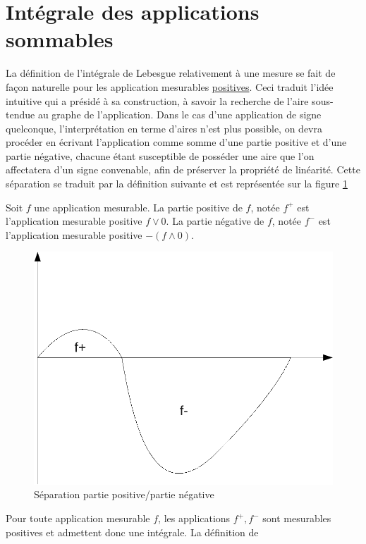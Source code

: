 \section{Intégrale des applications sommables}
La définition de l'intégrale de Lebesgue relativement à une mesure se fait de
façon naturelle pour les application mesurables \underline{positives}. Ceci
traduit l'idée intuitive qui a présidé à sa construction, à savoir la recherche
de l'aire sous-tendue au graphe de l'application. Dans le cas d'une application
de signe quelconque, l'interprétation en terme d'aires n'est plus possible, on
devra procéder en écrivant l'application comme somme d'une partie positive et
d'une partie négative, chacune étant susceptible de posséder une aire que 
l'on affectatera d'un signe convenable, afin de préserver la propriété de
linéarité. Cette séparation se traduit par la définition suivante et est représentée sur la figure \ref{ch3:fig1}
\begin{defn}
Soit $f$ une application mesurable. La partie positive de $f$, notée
$f^+$ est l'application mesurable positive $f \vee 0$. La partie
négative de $f$, notée $f^-$ est l'application mesurable positive $-(f
\wedge 0)$.
\end{defn}
\begin{figure}[h]
\includegraphics[scale=0.3]{images/fplus_fmoins.pdf}
\caption{Séparation partie positive/partie négative}\label{ch3:fig1}
\end{figure}
Pour toute application mesurable $f$, les applications $f^+,f^-$ sont
mesurables positives et admettent donc une intégrale. La définition de
